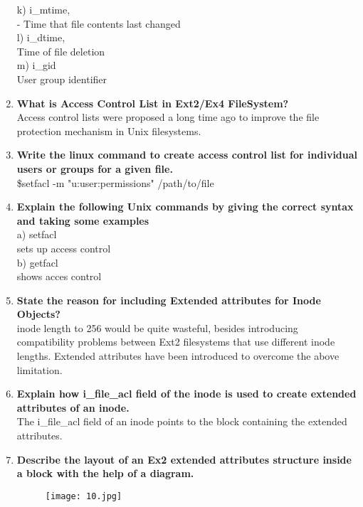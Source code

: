 \documentclass[a4paper,12pt]{article}
\begin{document}
\begin{flushleft}
\begin{enumerate}
k) i\_mtime, \\
{\color{red}- Time that file contents last changed}\\
l) i\_dtime, \\
{\color{red}Time of file deletion}\\
m) i\_gid\\
{\color{red}User group identifier}\\
\item \textbf{ What is Access Control List in Ext2/Ex4 FileSystem?}\\
{\color{red}Access control lists were proposed a long time ago to improve the
file protection mechanism in Unix filesystems.
}\\
\item \textbf{ Write the linux command to create access control list for individual users or groups for a given file.}\\
{\color{red}\$setfacl -m "u:user:permissions" /path/to/file
}\\
\item \textbf{ Explain the following Unix commands by giving the correct syntax and taking some examples}\\
a) setfacl\\
{\color{red}sets up access control}\\
 b) getfacl
\\{\color{red}shows acces control}\\
\item \textbf{ State the reason for including Extended attributes for Inode Objects? }\\
{\color{red}inode length to 256 would be
quite wasteful, besides introducing compatibility problems
between Ext2 filesystems that use different inode lengths.
 Extended attributes have been introduced to overcome the
above limitation.
}\\
\item \textbf{ Explain how i\_file\_acl field of the inode is used to create extended attributes of an inode.}\\
{\color{red}The i\_file\_acl field of an inode points to the block
containing the extended attributes.
}\\
\item \textbf{ Describe the layout of an Ex2 extended attributes structure inside a block with the help of a diagram.}\\
\begin{figure}[H]
 \centering
  \texttt{[image: 10.jpg]}
  \label{fig:11}
\end{figure}

\end{enumerate}
\end{flushleft}
\end{document}

